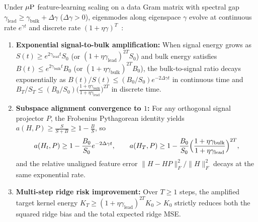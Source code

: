 \begin{lemma}\label{lem:spectral_bias_mup}
\leanok
{}
Under $\mu\mathrm{P}$ feature-learning scaling on a data Gram matrix with spectral gap $\gamma_{\mathrm{lead}} \ge \gamma_{\mathrm{bulk}} + \Delta\gamma$ ($\Delta\gamma > 0$), eigenmodes along eigenspace $\gamma$ evolve at continuous rate $e^{\gamma t}$ and discrete rate $(1 + \eta\gamma)^T$~\cite{rahaman2019spectral}:
\begin{enumerate}
\item \textbf{Exponential signal-to-bulk amplification:} When signal energy grows as $S(t) \ge e^{2\gamma_{\mathrm{lead}} t} S_0$ (or $(1+\eta\gamma_{\mathrm{lead}})^{2T} S_0$) and bulk energy satisfies $B(t) \le e^{2\gamma_{\mathrm{bulk}} t} B_0$ (or $(1+\eta\gamma_{\mathrm{bulk}})^{2T} B_0$), the bulk-to-signal ratio decays exponentially as $B(t)/S(t) \le (B_0/S_0)e^{-2\Delta\gamma t}$ in continuous time and $B_T/S_T \le (B_0/S_0)\bigl(\frac{1+\eta\gamma_{\mathrm{bulk}}}{1+\eta\gamma_{\mathrm{lead}}}\bigr)^{2T}$ in discrete time.
\item \textbf{Subspace alignment convergence to $1$:} For any orthogonal signal projector $P$, the Frobenius Pythagorean identity yields $a(H, P) \ge \frac{S}{S+B} \ge 1 - \frac{B}{S}$, so
\[
a(H_t, P) \ge 1 - \frac{B_0}{S_0}e^{-2\Delta\gamma t},\qquad
a(H_T, P) \ge 1 - \frac{B_0}{S_0}\Bigl(\frac{1+\eta\gamma_{\mathrm{bulk}}}{1+\eta\gamma_{\mathrm{lead}}}\Bigr)^{2T},
\]
and the relative unaligned feature error $\lVert H - HP\rVert_F^2 / \lVert H\rVert_F^2$ decays at the same exponential rate.
\item \textbf{Multi-step ridge risk improvement:} Over $T\ge 1$ steps, the amplified target kernel energy $K_T \ge (1+\eta\gamma_{\mathrm{lead}})^{2T} K_0 > K_0$ strictly reduces both the squared ridge bias and the total expected ridge MSE.
\end{enumerate}
\end{lemma}
